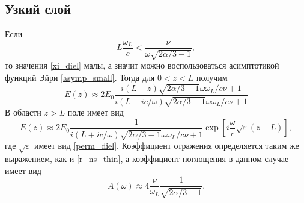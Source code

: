 \documentclass[12pt,a4paper]{article}
\numberwithin{equation}{section}
\begin{document}
\subsection{Узкий слой}
Если 
\begin{equation}
    \label{thin_diel}
    L\frac{\omega_L}{c}<\frac{\nu}{\omega\sqrt{2\alpha/3-1}},
\end{equation}
то значения \eqref{xi_diel} малы, а значит можно воспользоваться асимптотикой функций Эйри \eqref{asymp_small}. Тогда для $0<z<L$ получим
\begin{equation}
    \label{E1_diel_small}
    E\left(z\right)\approx 2E_0 \frac{i\left(L-z\right)\sqrt{2\alpha/3-1}\omega\omega_L/c\nu+1}{i\left(L+ic/\omega\right)\sqrt{2\alpha/3-1}\omega\omega_L/c\nu+1}
\end{equation}
В области $z>L$ поле имеет вид
\begin{equation}
    \label{E2_diel_small}
     E\left(z\right) \approx 2E_0   \frac{1}{i\left(L+ic/\omega\right)\sqrt{2\alpha/3-1}\omega\omega_L/c\nu+1}\exp\left[i\frac{\omega}{c}\sqrt{\varepsilon}\left(z-L\right)\right],
\end{equation}
где $\sqrt{\varepsilon}$ имеет вид \eqref{perm_diel}. Коэффициент отражения определяется таким же выражением, как и \eqref{r_ns_thin}, а коэффициент поглощения в данном случае имеет вид
\begin{equation}
    \label{a_diel_thin}
    A\left(\omega\right) \approx 4\frac{\nu}{\omega_L}\frac{1}{\sqrt{2\alpha/3-1}}.
\end{equation}
\end{document}
